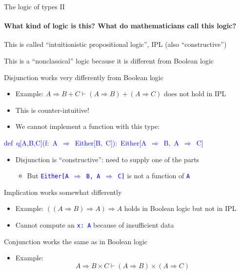 \documentclass[english]{beamer}
\newenvironment{lyxcode}
   {\par\begin{list}{}{
     \setlength{\rightmargin}{\leftmargin}
     \setlength{\listparindent}{0pt}%
     \raggedright
     \setlength{\itemsep}{0pt}
     \setlength{\parsep}{0pt}
     \normalfont\ttfamily}%
    \def\{{\char`\{}
    \def\}{\char`\}}
    \def\textasciitilde{\char`\~}
    \item[]}
   {\end{list}}
\begin{document}
\begin{frame}{The logic of types II}


\framesubtitle{What kind of logic is this? What do mathematicians call this logic?}

This is called ``intuitionistic propositional logic'', IPL (also
``constructive'')
\begin{itemize}
\item This is a ``nonclassical'' logic because it is different from Boolean
logic
\item Disjunction works very differently from Boolean logic
\begin{itemize}
\item Example: $A\Rightarrow B+C\vdash(A\Rightarrow B)+(A\Rightarrow C)$
does not hold in IPL
\item This is counter-intuitive!
\item We cannot implement a function with this type:
\end{itemize}
\begin{lyxcode}
\textcolor{blue}{\footnotesize{}def~q{[}A,B,C{]}(f:~A~$\Rightarrow$~Either{[}B,~C{]}):~Either{[}A~$\Rightarrow$~B,~A~$\Rightarrow$~C{]}}{\footnotesize \par}
\end{lyxcode}
\begin{itemize}
\item Disjunction is ``constructive'': need to supply one of the parts
\begin{itemize}
\item But \texttt{\textcolor{blue}{\footnotesize{}Either{[}A $\Rightarrow$
B, A $\Rightarrow$ C{]}}} is not a function of \texttt{\textcolor{blue}{\footnotesize{}A}} 
\end{itemize}
\end{itemize}
\item Implication works somewhat differently
\begin{itemize}
\item Example: $\left(\left(A\Rightarrow B\right)\Rightarrow A\right)\Rightarrow A$
holds in Boolean logic but not in IPL
\item Cannot compute an \texttt{\textcolor{blue}{\footnotesize{}x:\ A}}
because of insufficient data
\end{itemize}
\item Conjunction works the same as in Boolean logic
\begin{itemize}
\item Example: 
\[
A\Rightarrow B\times C\vdash\left(A\Rightarrow B\right)\times\left(A\Rightarrow C\right)
\]
 
\end{itemize}
\end{itemize}
\end{frame}
\end{document}
